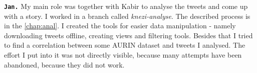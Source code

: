 \textbf{\texttt{Jan.}}
My main role was together with Kabir to analyse the tweets and come up with a story. I worked in a branch called {\it knezi-analyse}. The described process is in the \autoref{chap:anal}. I created the tools for easier data manipulation - namely downloading tweets offline, creating views and filtering tools. Besides that I tried to find a correlation between some AURIN dataset and tweets I analysed. The effort I put into it was not directly visible, because many attempts have been abandoned, because they did not work.